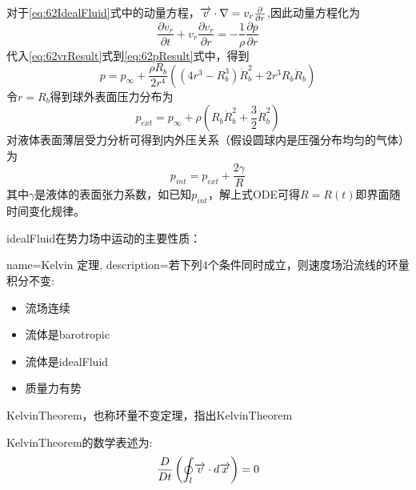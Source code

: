 对于\eqref{eq:62IdealFluid}式中的动量方程，$\overrightarrow{v}\cdot \nabla =v_r\frac{\partial}{\partial r}$,因此动量方程化为
\begin{equation}\label{eq:62pResult}
\frac{\partial v_r}{\partial t}+v_r \frac{\partial v_r}{\partial r}=-\frac{1}{\rho}\frac{\partial p}{\partial r}
\end{equation}
代入\eqref{eq:62vrResult}式到\eqref{eq:62pResult}式中，得到
\begin{equation}
p=p_{\infty}+\frac{\rho R_b}{2r^4}((4r^3-R_b^3)\dot{R}_b^2+2r^3R_b\ddot{R}_b)
\end{equation}
令$r=R_b$得到球外表面压力分布为
\begin{equation}
p_{ext}=p_{\infty}+\rho(R_b\dot{R}_b^2+\frac{3}{2}\dot{R}_b^2)
\end{equation}
对液体表面薄层受力分析可得到内外压关系（假设圆球内是压强分布均匀的气体）为
\begin{equation}
p_{int}=p_{ext}+\frac{2\gamma}{R}
\end{equation}
其中$\gamma$是液体的表面张力系数，如已知$p_{int}$，解上式ODE可得$R=R(t)$即界面随时间变化规律。

\gls{idealFluid}在势力场中运动的主要性质：
{
  name=Kelvin 定理,
  description=若下列4个条件同时成立，则速度场沿流线的环量积分不变:
\begin{itemize}
\item 流场连续
\item 流体是\gls{barotropic}
\item 流体是\gls{idealFluid}
\item 质量力有势
\end{itemize}
}
\gls{KelvinTheorem}，也称环量不变定理，指出\glsdesc{KelvinTheorem}

\gls{KelvinTheorem}的数学表述为:
\begin{equation}\label{eq:62KelvinMath}
\frac{D}{Dt} \left(\oint_{l}\overrightarrow{v}\cdot d\overrightarrow{x}\right) =0
\end{equation}

